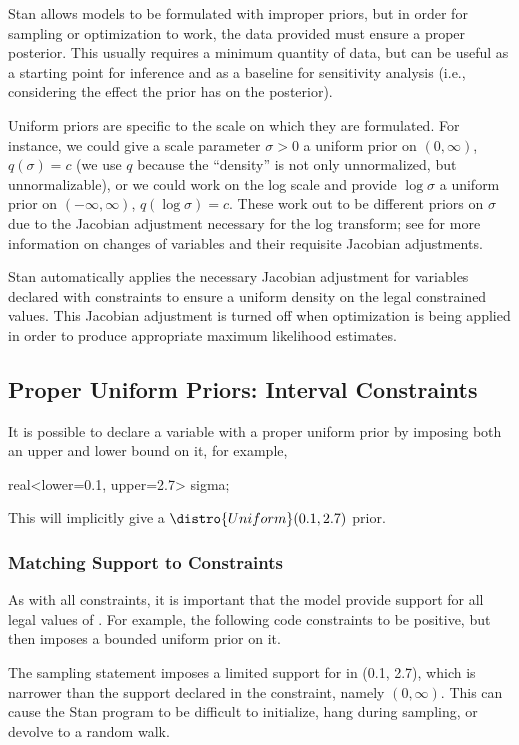 Stan allows models to be formulated with improper priors, but in order
for sampling or optimization to work, the data provided must ensure a
proper posterior.  This usually requires a minimum quantity of data,
but can be useful as a starting point for inference and as a baseline
for sensitivity analysis (i.e., considering the effect the prior
has on the posterior).

Uniform priors are specific to the scale on which they are formulated.
For instance, we could give a scale parameter $\sigma > 0$ a uniform
prior on $(0,\infty)$, $q(\sigma) = c$ (we use $q$ because the
``density'' is not only unnormalized, but unnormalizable), or we could
work on the log scale and provide $\log \sigma$ a uniform prior on
$(-\infty,\infty)$, $q(\log \sigma) = c$.  These work out to be
different priors on $\sigma$ due to the Jacobian adjustment necessary
for the log transform; see  for more
information on changes of variables and their requisite Jacobian
adjustments.

Stan automatically applies the necessary Jacobian adjustment for
variables declared with constraints to ensure a uniform density on the
legal constrained values.  This Jacobian adjustment is turned off when
optimization is being applied in order to produce appropriate maximum
likelihood estimates.

\subsection{Proper Uniform Priors: Interval Constraints}

It is possible to declare a variable with a proper uniform prior by
imposing both an upper and lower bound on it, for example,
%
\begin{stancode}
real<lower=0.1, upper=2.7> sigma;
\end{stancode}
%
This will implicitly give  a $\distro{Uniform}(0.1, 2.7)$
prior.  

\subsubsection{Matching Support to Constraints}

As with all constraints, it is important that the model
provide support for all legal values of .  For example,
the following code constraints  to be positive, but then
imposes a bounded uniform prior on it.
%
\begin{stancode}
parameters {
  real<lower=0> sigma;
  ...
model {
  // *** bad *** : support narrower than constraint
  sigma ~ uniform(0.1, 2.7);  
\end{stancode}
%
The sampling statement imposes a limited support for  in
(0.1, 2.7), which is narrower than the support declared in the
constraint, namely $(0, \infty)$.  This can cause the Stan program to
be difficult to initialize, hang during sampling, or devolve to a
random walk.

